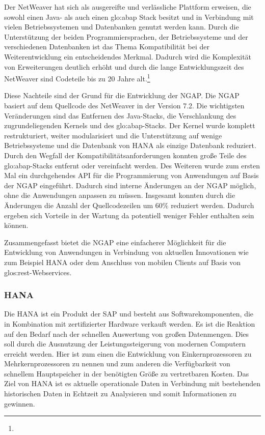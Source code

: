 \begin{onehalfspacing}
Der \gls{NetWeaver} hat sich als ausgereifte und verlässliche Plattform erweisen, die sowohl einen Java- als auch einen \gls{glo:abap} Stack besitzt und in Verbindung mit vielen Betriebssystemen und Datenbanken genutzt werden kann. Durch die Unterstützung der beiden Programmiersprachen, der Betriebssysteme und der verschiedenen Datenbanken ist das Thema Kompatibilität bei der Weiterentwicklung ein entscheidendes Merkmal. Dadurch wird die Komplexität von Erweiterungen deutlich erhöht und durch die lange Entwicklungszeit des \gls{NetWeaver} sind Codeteile bis zu 20 Jahre alt.\footnote{ }

Diese Nachteile sind der Grund für die Entwicklung der \gls{NGAP}. Die \gls{NGAP} basiert auf dem Quellcode des \gls{NetWeaver} in der Version 7.2. Die wichtigsten Veränderungen sind das Entfernen des Java-Stacks, die Verschlankung des zugrundeliegenden Kernels und des \gls{glo:abap}-Stacks. Der Kernel wurde komplett restrukturiert, weiter modularisiert und die Unterstützung auf wenige Betriebssysteme und die Datenbank von \gls{HANA} als einzige Datenbank reduziert. Durch den Wegfall der Kompatibilitätsanforderungen konnten große Teile des \gls{glo:abap}-Stacks entfernt oder vereinfacht werden. Des Weiteren wurde zum ersten Mal ein durchgehendes API für die Programmierung von Anwendungen auf Basis der \gls{NGAP} eingeführt. Dadurch sind interne Änderungen an der \gls{NGAP} möglich, ohne die Anwendungen anpassen zu müssen. Insgesamt konnten durch die Änderungen die Anzahl der Quellcodezeilen um 60\% reduziert werden. Dadurch ergeben sich Vorteile in der Wartung da potentiell weniger Fehler enthalten sein können.

Zusammengefasst bietet die \gls{NGAP} eine einfacherer Möglichkeit für die Entwicklung von Anwendungen in Verbindung von aktuellen Innovationen wie zum Beispiel \gls{HANA} oder dem Anschluss von mobilen Clients auf Basis von \gls{glos:rest}-Webservices.

\subsubsection{HANA}
Die \gls{HANA} ist ein Produkt der SAP und besteht aus Softwarekomponenten, die in Kombination mit zertifizierter Hardware verkauft werden. Es ist die Reaktion auf den Bedarf nach der schnellen Auswertung von großen Datenmengen. Dies soll durch die Ausnutzung der Leistungssteigerung von modernen Computern erreicht werden. Hier ist zum einen die Entwicklung von Einkernprozessoren zu Mehrkernprozessoren zu nennen und zum anderen die Verfügbarkeit von schnellem Hauptspeicher in der benötigten Größe zu vertretbaren Kosten. Das Ziel von \gls{HANA} ist es aktuelle operationale Daten in Verbindung mit bestehenden historischen Daten in Echtzeit zu Analysieren und somit Informationen zu gewinnen.


\end{onehalfspacing}
